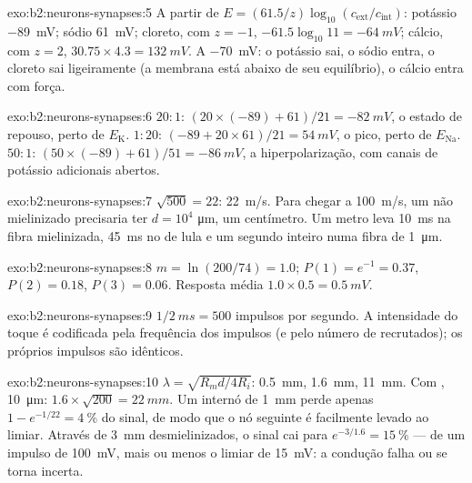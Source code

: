 \begin{solution}{exo:b2:neurons-synapses:5}
A partir de $E = (61.5/z)\log_{10}(c_{\text{ext}}/c_{\text{int}})$:
potássio \qty{-89}{mV}; sódio \qty{+61}{mV}; cloreto, com $z =
-1$, $-61.5\log_{10} 11 = \qty{-64}{mV}$; cálcio, com $z = 2$,
$30.75\times 4.3 = \qty{+132}{mV}$. A \qty{-70}{mV}: o potássio sai, o
sódio entra, o cloreto sai ligeiramente (a membrana está abaixo de seu
equilíbrio), o cálcio entra com força.
\end{solution}

\begin{solution}{exo:b2:neurons-synapses:6}
$20 : 1$: $(20\times(-89) + 61)/21 = \qty{-82}{mV}$, o estado de
repouso, perto de $E_{\mathrm K}$. $1 : 20$: $(-89 + 20\times 61)/21 =
\qty{+54}{mV}$, o pico, perto de $E_{\mathrm{Na}}$. $50 : 1$: $(50\times
(-89) + 61)/51 = \qty{-86}{mV}$, a hiperpolarização, com canais de
potássio adicionais abertos.
\end{solution}

\begin{solution}{exo:b2:neurons-synapses:7}
$\sqrt{500} = 22$: \qty{22}{m/s}. Para chegar a \qty{100}{m/s}, um
 não mielinizado precisaria ter $d = 10^{4}$ \unit{\micro m}, um
centímetro. Um metro leva \qty{10}{ms} na fibra mielinizada,
\qty{45}{ms} no  de lula e um segundo inteiro numa fibra de
\qty{1}{\micro m}.
\end{solution}

\begin{solution}{exo:b2:neurons-synapses:8}
$m = \ln(200/74) = 1.0$; $P(1) = e^{-1} = 0.37$, $P(2) = 0.18$, $P(3)
= 0.06$. Resposta média $1.0\times 0.5 = \qty{0.5}{mV}$.
\end{solution}

\begin{solution}{exo:b2:neurons-synapses:9}
$1/\qty{2}{ms} = 500$ impulsos por segundo. A intensidade do toque é
codificada pela frequência dos impulsos (e pelo número de 
recrutados); os próprios impulsos são idênticos.
\end{solution}

\begin{solution}{exo:b2:neurons-synapses:10}
$\lambda = \sqrt{R_m d/4R_i}$: \qty{0.5}{mm}, \qty{1.6}{mm},
\qty{11}{mm}. Com , \qty{10}{\micro m}: $1.6\times\sqrt{200} =
\qty{22}{mm}$. Um internó de \qty{1}{mm} perde apenas $1 - e^{-1/22}
= \qty{4}{\%}$ do sinal, de modo que o nó seguinte é facilmente levado
ao limiar. Através de \qty{3}{mm} desmielinizados, o sinal cai para
$e^{-3/1.6} = \qty{15}{\%}$ --- de um impulso de \qty{100}{mV}, mais ou
menos o limiar de \qty{15}{mV}: a condução falha ou se torna incerta.
\end{solution}

